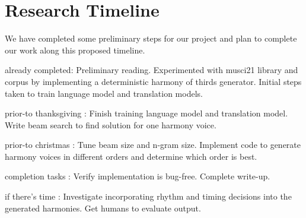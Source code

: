 \documentclass{sig-alternate}
\begin{document}
\section{Research Timeline}
\label{sec:research_timeline}
We have completed some preliminary steps for our project and plan to complete
our work along this proposed timeline.

\begin{itemize*}
	\item {\sc already completed}: Preliminary reading. Experimented with musci21 library and corpus by implementing a deterministic harmony of thirds generator. Initial steps taken to train language model and translation models.\vspace{3pt}
	\item {\sc prior-to thanksgiving} : Finish training language model and translation model. Write beam search to find solution for one harmony voice.\vspace{3pt}
	\item {\sc prior-to christmas} : Tune beam size and n-gram size. Implement code to generate harmony voices in different orders and determine which order is best.\vspace{3pt}
	\item {\sc completion tasks} : Verify implementation is bug-free. Complete write-up.\vspace{3pt}
	\item {\sc if there's time} : Investigate incorporating rhythm and timing decisions into the generated harmonies. Get humans to evaluate output.
\end{itemize*}

\end{document}
